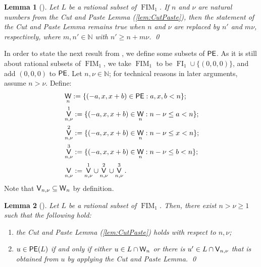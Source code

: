 \documentclass[reqno]{amsart}
\theoremstyle{plain}
\newtheorem{lem}{Lemma}[section]
\theoremstyle{definition}
\DeclareMathOperator{\FI}{FI}
\DeclareMathOperator{\FIM}{FIM}
\DeclareMathOperator{\PE}{\textup{\textsf{PE}}}
\DeclareMathOperator{\W}{\textup{\textsf{W}}}
\DeclareMathOperator{\V}{\textup{\textsf{V}}}
\newenvironment{thmenumerate}{\begin{enumerate}[topsep=0mm, leftmargin=14mm,itemsep=1mm,label=\textup{(\roman*)}]
}{\end{enumerate}}
\numberwithin{equation}{section}
\begin{document}
\begin{lem}[{\cite[Corollary 4.3]{SilvaRationalSubset}}]
\label{lem:CutPasteCor}
Let $L$ be a rational subset of $\FIM_1$. If $n$ and $\nu$ are natural numbers from the Cut and Paste Lemma (\ref{lem:CutPaste}), then the statement of the Cut and Paste Lemma remains true when $n$ and $\nu$ are replaced by $n'$ and $m\nu$, respectively, where $m,n'\in\mathbb{N}$ with $n'\geq n+m\nu$. \qed
\end{lem}


In order to state the next result from \cite{SilvaRationalSubset},
we define some subsets of $\PE$. As it is still about rational subsets of $\FIM_1$, we 
take $\FIM_1$ to be $\FI_1\cup\{(0,0,0)\}$,  and add $(0,0,0)$ to $\PE$. 
Let $n,\nu\in\mathbb{N}$; for technical reasons in later arguments, assume $n>\nu$. Define:
\begin{align*}
    &\W_{n} := \{(-a, x, x+b)\in \PE : a, x, b < n\};\\
    &\V_{n,\nu}^1 := \{(-a, x, x+b) \in \W_{n} : n-\nu\leq a <n\};\\
    &\V_{n,\nu}^2 := \{(-a, x, x+b)\in \W_{n} : n-\nu \leq  x <n\};\\
    &\V_{n, \nu}^3 := \{(-a, x, x+b) \in \W_{n} : n-\nu \leq b <n \};\\
    &\V_{n,\nu} := \V_{n,\nu}^1\cup \V_{n,\nu}^2 \cup \V_{n,\nu}^3.
\end{align*}
Note that $\V_{n,\nu}\subseteq \W_n$ by definition.


\begin{lem}[{\cite[Theorem 5.1]{SilvaRationalSubset}}]
\label{la:SilvaThm}
Let $L$ be a rational subset of $\FIM_1$. Then, there exist $n > \nu \geq 1$ such that the following hold: 
\begin{thmenumerate}
    \item \label{it:SilvaThm1} the Cut and Paste Lemma (\ref{lem:CutPaste}) holds with respect to $n, \nu$;
    \item \label{it:SilvaThm2} $u\in \PE(L)$ if and only if either $u\in L \cap\W_{n}$ or there is $u'\in L\cap \V_{n,\nu}$ that is obtained from $u$ by applying the Cut and Paste Lemma. \qed
\end{thmenumerate}
\end{lem}
\end{document}
